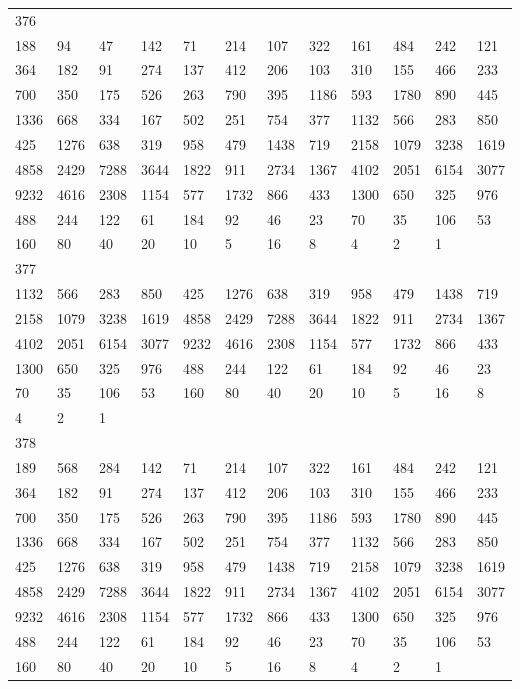 \begin{longtable}{llllllllllll}
376&&&&&&&&&&&\\
188& 94& 47& 142& 71& 214& 107& 322& 161& 484& 242& 121\\
364& 182& 91& 274& 137& 412& 206& 103& 310& 155& 466& 233\\
700& 350& 175& 526& 263& 790& 395& 1186& 593& 1780& 890& 445\\
1336& 668& 334& 167& 502& 251& 754& 377& 1132& 566& 283& 850\\
425& 1276& 638& 319& 958& 479& 1438& 719& 2158& 1079& 3238& 1619\\
4858& 2429& 7288& 3644& 1822& 911& 2734& 1367& 4102& 2051& 6154& 3077\\
9232& 4616& 2308& 1154& 577& 1732& 866& 433& 1300& 650& 325& 976\\
488& 244& 122& 61& 184& 92& 46& 23& 70& 35& 106& 53\\
160& 80& 40& 20& 10& 5& 16& 8& 4& 2& 1& \\

377&&&&&&&&&&&\\
1132& 566& 283& 850& 425& 1276& 638& 319& 958& 479& 1438& 719\\
2158& 1079& 3238& 1619& 4858& 2429& 7288& 3644& 1822& 911& 2734& 1367\\
4102& 2051& 6154& 3077& 9232& 4616& 2308& 1154& 577& 1732& 866& 433\\
1300& 650& 325& 976& 488& 244& 122& 61& 184& 92& 46& 23\\
70& 35& 106& 53& 160& 80& 40& 20& 10& 5& 16& 8\\
4& 2& 1& \\

378&&&&&&&&&&&\\
189& 568& 284& 142& 71& 214& 107& 322& 161& 484& 242& 121\\
364& 182& 91& 274& 137& 412& 206& 103& 310& 155& 466& 233\\
700& 350& 175& 526& 263& 790& 395& 1186& 593& 1780& 890& 445\\
1336& 668& 334& 167& 502& 251& 754& 377& 1132& 566& 283& 850\\
425& 1276& 638& 319& 958& 479& 1438& 719& 2158& 1079& 3238& 1619\\
4858& 2429& 7288& 3644& 1822& 911& 2734& 1367& 4102& 2051& 6154& 3077\\
9232& 4616& 2308& 1154& 577& 1732& 866& 433& 1300& 650& 325& 976\\
488& 244& 122& 61& 184& 92& 46& 23& 70& 35& 106& 53\\
160& 80& 40& 20& 10& 5& 16& 8& 4& 2& 1& \\


\end{longtable}
